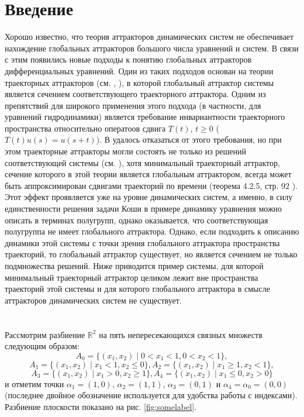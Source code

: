 \section{Введение}

Хорошо известно, что теория аттракторов динамических систем не обеспечивает нахождение глобальных аттракторов
большого числа уравнений и систем.
В связи с этим появились новые подходы к понятию глобальных аттракторов дифференциальных уравнений.
Один из таких подходов основан на теории траекторных аттракторов (см. \cite{b26}, \cite{b29}),
в которой глобальный аттрактор системы является сечением соответствующего  траекторного аттрактора.
Одним из препятствий для широкого применения этого подхода (в частности, для уравнений гидродинамики)
является требование инвариантности траекторного пространства относительно оператоов сдвига
$T(t)$, $t\geq 0$ ($T(t)u(s) = u(s+t)$).
В \cite{b33} удалось отказаться от этого требования,
но при этом траекторные аттракторы могли состоять  не только из решений соответствующей системы (см. \cite{b37}),
хотя минимальный траекторный аттрактор, сечение которого в этой теории является глобальным аттрактором,
всегда может быть аппроксимирован сдвигами траекторий по времени (теорема 4.2.5, стр. 92 \cite{37}).
Этот эффект проявляется уже на уровне динамических систем, а именно,
в силу единственности решения задачи Коши в примере динамику уравнения можно описать в терминах полугрупп,
однако оказывается, что соответствующая полугруппа не имеет глобального аттрактора.
Однако, если подходить к описанию динамики этой системы с точки зрения глобального аттрактора пространства траекторий,
то глобальный аттрактор существует,
но является сечением не только подмножества решений.
Ниже приводится пример
системы, для которой минимальный траекторный аттрактор целиком лежит вне пространства траекторий этой системы
и для которого глобального аттрактора в смысле аттракторов динамических систем не существует.

\section{}
Рассмотрим разбиение  $\mathbb{R}^2$ на пять непересекающихся связных множеств следующим образом:
$$
	A_0 = \{ (x_1, x_2) \mid 0 < x_1 < 1, 0 < x_2 < 1\},
$$
$$
	A_1 = \{ (x_1, x_2) \mid x_1 < 1, x_2 \leq 0  \},
	A_2 = \{ (x_1, x_2) \mid x_1 \geq 1, x_2 < 1  \},
$$
$$
	A_3 = \{ (x_1, x_2) \mid x_1 > 0, x_2 \geq 1  \},
	A_4 = \{ (x_1, x_2) \mid x_1 \leq 0, x_2 > 0  \}
$$
и отметим точки
$\alpha_1=(1, 0)$,
$\alpha_2=(1, 1)$,
$\alpha_3=(0, 1)$ и
$\alpha_4=\alpha_0=(0, 0)$
(последнее двойное обозначение используется для удобства работы с индексами).
Разбиение плоскости показано на рис. \ref{fig:somelabel}.

